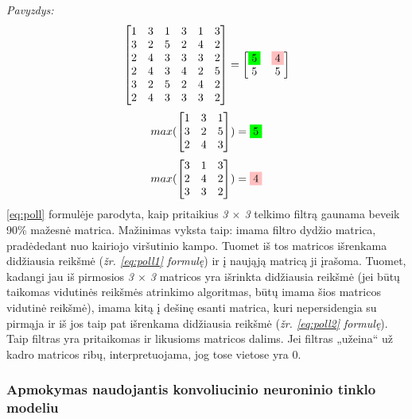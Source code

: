 \documentclass{VUMIFInfKursinis}
\begin{document}
\textit{Pavyzdys:}
\begin{equation}\label{eq:poll}
	\begin{bmatrix}
	1 & 3 & 1 & 3 & 1 & 3 \\
	3 & 2 & 5 & 2 & 4 & 2 \\
	2 & 4 & 3 & 3 & 3 & 2 \\
	2 & 4 & 3 & 4 & 2 & 5 \\
	3 & 2 & 5 & 2 & 4 & 2 \\
	2 & 4 & 3 & 3 & 3 & 2
	\end{bmatrix}
	= 
	\begin{bmatrix}
	\colorbox{green}{5} & \colorbox{pink}{4} \\
	5 & 5 
	\end{bmatrix}
\end{equation}
\begin{equation}\label{eq:poll1}
	max(
	\begin{bmatrix}
	1 & 3 & 1 \\
	3 & 2 & 5 \\
	2 & 4 & 3
	\end{bmatrix}
	) = \colorbox{green}{5}
\end{equation}
\begin{equation}\label{eq:poll2}
	max(
	\begin{bmatrix}
	3 & 1 & 3 \\
	2 & 4 & 2 \\
	3 & 3 & 2
	\end{bmatrix}
	) = \colorbox{pink}{4}
\end{equation}
\ref{eq:poll} formulėje parodyta, kaip pritaikius \textit{3 $\times$ 3} telkimo filtrą gaunama beveik 90\% mažesnė matrica. Mažinimas vyksta taip: imama filtro dydžio matrica, pradėdedant nuo kairiojo viršutinio kampo. Tuomet iš tos matricos išrenkama didžiausia reikšmė (\textit{žr. \ref{eq:poll1} formulę}) ir į naująją matricą ji įrašoma. Tuomet, kadangi jau iš pirmosios \textit{3 $\times$ 3} matricos yra išrinkta didžiausia reikšmė (jei būtų taikomas vidutinės reikšmės atrinkimo algoritmas, būtų imama šios matricos vidutinė reikšmė), imama kitą į dešinę esanti matrica, kuri nepersidengia su pirmąja ir iš jos taip pat išrenkama didžiausia reikšmė (\textit{žr. \ref{eq:poll2} formulę}). Taip filtras yra pritaikomas ir likusioms matricos dalims. Jei filtras „užeina“ už kadro matricos ribų, interpretuojama, jog tose vietose yra 0.

\subsubsection{Apmokymas naudojantis konvoliucinio neuroninio tinklo modeliu}
\end{document}
